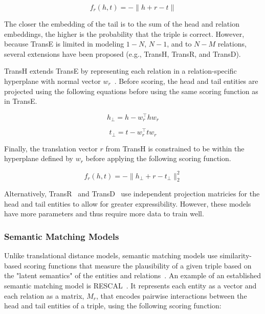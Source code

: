 \begin{equation}\label{eq:trans_e_scoring_function}
    f_r(h,t) = - \|h + r - t\|
\end{equation}

The closer the embedding of the tail is to the sum of the head and relation embeddings, the higher is the probability that the triple is correct.
However, because TransE is limited in modeling $1-N$, $N-1$, and to $N-M$ relations, several extensions have been proposed (e.g., TransH, TransR, and TransD).

TransH extends TransE by representing each relation in a relation-specific hyperplane with normal vector $w_r$~\cite{Wang2014}.
Before scoring, the head and tail entities are projected using the following equations before using the same scoring function as in TransE\@.

\begin{equation} \label{eq:trans_h_proj_head}
h_{\perp} = h -w_{r}^\top hw_r
\end{equation}

\begin{equation} \label{eq:trans_h_proj_tail}
t_{\perp} = t -w_{r}^\top tw_r
\end{equation}

Finally, the translation vector $r$ from TransH is constrained to be within the hyperplane defined by $w_r$ before applying the following scoring function.

\begin{equation} \label{eq:trans_h_scoring_function}
    f_r(h,t) = -\|h_{\perp} + r - t_{\perp}\|_{2}^2
\end{equation}

Alternatively, TransR~\cite{Lin2015} and TransD~\cite{Ji2015} use independent projection matricies for the head and tail entities to allow for greater expressibility.
However, these models have more parameters and thus require more data to train well.

\subsubsection{Semantic Matching Models}

Unlike translational distance models, semantic matching models use similarity-based scoring functions that measure the plausibility of a given triple based on the "latent semantics" of the entities and relations~\cite{Wang2017}.
An example of an established semantic matching model is RESCAL~\cite{Nickel2011}.
It represents each entity as a vector and each relation as a matrix, $M_r$, that encodes pairwise interactions between the head and tail entities of a triple, using the following scoring function:

